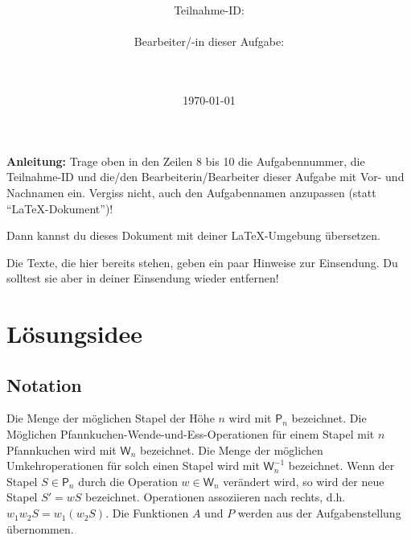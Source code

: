 \documentclass[a4paper,10pt,ngerman]{scrartcl}
\title{\textbf{\Huge\Aufgabe}}
\author{\LARGE Teilnahme-ID: \LARGE \TeilnahmeId \\\\
  \LARGE Bearbeiter/-in dieser Aufgabe: \\
  \LARGE \Name\\\\}
\date{\LARGE\today}
\begin{document}
\maketitle
\tableofcontents

\vspace{0.5cm}

\textbf{Anleitung:} Trage oben in den Zeilen 8 bis 10 die Aufgabennummer, die Teilnahme-ID und die/den Bearbeiterin/Bearbeiter dieser Aufgabe mit Vor- und Nachnamen ein.
Vergiss nicht, auch den Aufgabennamen anzupassen (statt "`\LaTeX-Dokument"')!

Dann kannst du dieses Dokument mit deiner \LaTeX-Umgebung übersetzen.

Die Texte, die hier bereits stehen, geben ein paar Hinweise zur Einsendung. Du
solltest sie aber in deiner Einsendung wieder entfernen!

\section{Lösungsidee}
\subsection{Notation}
Die Menge der möglichen Stapel der Höhe $n$ wird mit $\mathsf{P}_n$ bezeichnet.
Die Möglichen Pfannkuchen-Wende-und-Ess-Operationen für einem Stapel mit $n$ Pfannkuchen
wird mit $\mathsf{W}_n$ bezeichnet. Die Menge der möglichen Umkehroperationen für solch einen Stapel
wird mit $\mathsf{W}^{-1}_n$ bezeichnet. Wenn der Stapel $S \in \mathsf{P}_n$ durch die Operation
$w \in \mathsf{W}_n$ verändert wird, so wird der neue Stapel $S' = w S$ bezeichnet. Operationen
assoziieren nach rechts, d.h. $w_1 w_2 S = w_1 (w_2 S)$. Die Funktionen $A$ und $P$ werden aus
der Aufgabenstellung übernommen.
\end{document}
